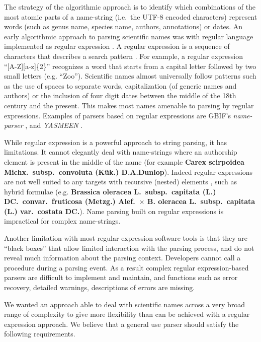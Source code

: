 \documentclass{bmcart}
\begin{document}
The strategy of the algorithmic approach is to identify which combinations of the most atomic parts of a name-string (i.e.\ the UTF-8 encoded characters) represent words (such as genus name, species name, authors, annotations) or dates. An early algorithmic approach to parsing scientific names was with regular language implemented as regular expression \cite{Leary2007}. A regular expression is a sequence of characters that describes a search pattern \cite{aho1992foundations}. For example, a regular expression ``[A-Z][a-z]\{2\}'' recognizes a word that starts from a capital letter followed by two small letters (e.g. ``Zoo''). Scientific names almost universally follow patterns such as the use of spaces to separate words, capitalization (of generic names and authors) or the inclusion of four digit dates between the middle of the 18th century and the present. This makes most names amenable to parsing by regular expressions.  Examples of parsers based on regular expressions are GBIF's \textit{name-parser} \cite{gbifNameParser}, and \textit{YASMEEN} \cite{VandenBerghe2015}.

While regular expression is a powerful approach to string parsing, it has limitations. It cannot elegantly deal with name-strings where an authorship element is present in the middle of the name (for example \textbf{Carex scirpoidea Michx.\ subsp.\ convoluta (Kük.) D.A.Dunlop}). Indeed regular expressions are not well suited to any targets with recursive (nested) elements \cite{yu1997handbook}, such as hybrid formulae (e.g. \textbf{Brassica oleracea L.\ subsp.\ capitata (L.) DC.\ convar.\ fruticosa (Metzg.) Alef.\ $\times$ B.  oleracea L.\ subsp.\ capitata (L.) var.\ costata DC.}). Name parsing built on regular expressions is impractical for complex name-strings.

Another limitation with most regular expression software tools is that they are ``black boxes'' that allow limited interaction with the parsing process, and do not reveal much information about the parsing context. Developers cannot call a procedure during a parsing event. As a result complex regular expression-based parsers are difficult to implement and maintain, and functions such as error recovery, detailed warnings, descriptions of errors are missing.

We wanted an approach able to deal with scientific names across a very broad range of complexity to give more flexibility than can be achieved with a regular expression approach. We believe that a general use parser should satisfy the following requirements.
\end{document}
